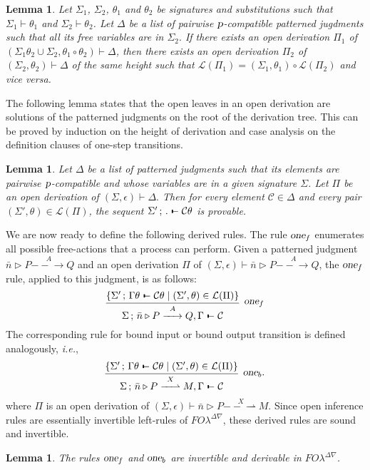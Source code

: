 \documentclass{acmtrans2m}
\newtheorem{lemma}[theorem]{Lemma}
\newcommand{\ie}{{\em i.e.}}
\def\Cscr{{\mathcal C}}
\def\Lscr{{\mathcal L}}
\def\relbar{\mathrel{\smash-}}
\def\joinrelm{\mathrel{\mkern-3.2mu}}
\def\tailpiece{\kern 1pt\vrule height 1ex width 0.3ex depth -.25ex}
\def\seqsym{\mathrel{\tailpiece\joinrelm\relbar}}
\newcommand{\FOL   }{FO\lambda}
\newcommand{\FOLDNb}{\FOL^{\Delta\nabla}}
\newcommand{\Judg}[2]{#1\triangleright#2}
\newcommand{\NSeq}[3]{#1\,;\,#2 \seqsym #3}
\newcommand{\one  }[3]{#1\stackrel{#2}{-\!\!-\!\!\!\rightarrow    } #3}
\newcommand{\onep }[3]{#1\stackrel{#2}{-\!\!-\!\!\!\rightharpoonup} #3}
\newcommand{\proc}{\hbox{\sl p}}
\begin{document}
\begin{lemma}
\label{lm:solution-comp}
Let $\Sigma_1$, $\Sigma_2$, $\theta_1$ and $\theta_2$ be signatures and substitutions
such that $\Sigma_1 \vdash \theta_1$ and $\Sigma_2 \vdash \theta_2$. Let $\Delta$ be a list of
pairwise $\proc$-compatible patterned jugdments such that all its free variables are in $\Sigma_2.$
If there exists an open derivation $\Pi_1$ of 
$(\Sigma_1 \theta_2 \cup \Sigma_2, \theta_1 \circ \theta_2) \vdash \Delta$, then there exists an open 
derivation $\Pi_2$ of $(\Sigma_2, \theta_2) \vdash \Delta$ of the same height such that 
$\Lscr(\Pi_1) = (\Sigma_1, \theta_1) \circ \Lscr(\Pi_2)$
and vice versa.
\end{lemma}

The following lemma states that the open leaves in an open derivation are solutions
of the patterned judgments on the root of the derivation tree. This can be proved
by induction on the height of derivation and case analysis on the definition clauses
of one-step transitions.

\begin{lemma}
\label{lm:open-drv-sound}
Let $\Delta$ be a list of patterned judgments such that its elements are pairwise
$\proc$-compatible and whose variables are in a given signature $\Sigma$. 
Let $\Pi$ be an open derivation of $(\Sigma, \epsilon) \vdash \Delta.$ 
Then for every element $\Cscr \in \Delta$ and every pair
$(\Sigma', \theta) \in \Lscr(\Pi)$, the sequent
$\NSeq{\Sigma'}{.}{\Cscr \theta}$ is provable.
\end{lemma}

We are now ready to define the following derived rules.
The rule $\hbox{\sl one}_f$ enumerates all possible free-actions that a process can 
perform. Given a patterned judgment  $\Judg{\bar n}{\one P A Q}$
and an open derivation $\Pi$ of $(\Sigma, \epsilon) \vdash \Judg{\bar n}{\one P A Q}$,
the $\hbox{\sl one}_f$ rule, applied to this judgment, is as follows:
$$
\infer[\onef]
{\NSeq{\Sigma}{\Judg{\bar n}{\one P A Q}, \Gamma}{\Cscr}}
{
\{
\NSeq {\Sigma'} {\Gamma\theta} {\Cscr\theta}
\mid (\Sigma', \theta) \in \Lscr(\Pi)
\}
}
$$
The corresponding rule for bound input or bound output transition is defined 
analogously, \ie,
$$
\infer[\oneb.]
{\NSeq{\Sigma}{\Judg{\bar n}{\onep P X M}, \Gamma} \Cscr}
{
\{
\NSeq {\Sigma'} {\Gamma\theta} {\Cscr\theta}
\mid (\Sigma', \theta) \in \Lscr(\Pi)
\}
}
$$
where $\Pi$ is an open derivation of $(\Sigma, \epsilon) \vdash \Judg{\bar n}{\onep P X M}.$
Since open inference rules are essentially invertible left-rules of $\FOLDNb$,
these derived rules are sound and invertible.
\begin{lemma}
The rules $\hbox{\sl one}_f$ and $\hbox{\sl one}_b$ are invertible and derivable in $\FOLDNb$.
\end{lemma}
\end{document}
